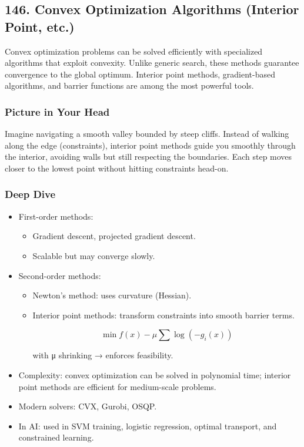 \documentclass[
  letterpaper,
  DIV=11,
  numbers=noendperiod]{scrreprt}
\providecommand{\tightlist}{%
  \setlength{\itemsep}{0pt}\setlength{\parskip}{0pt}}
\begin{document}
\subsection{146. Convex Optimization Algorithms (Interior Point,
etc.)}\label{convex-optimization-algorithms-interior-point-etc.}

Convex optimization problems can be solved efficiently with specialized
algorithms that exploit convexity. Unlike generic search, these methods
guarantee convergence to the global optimum. Interior point methods,
gradient-based algorithms, and barrier functions are among the most
powerful tools.

\subsubsection{Picture in Your Head}\label{picture-in-your-head-145}

Imagine navigating a smooth valley bounded by steep cliffs. Instead of
walking along the edge (constraints), interior point methods guide you
smoothly through the interior, avoiding walls but still respecting the
boundaries. Each step moves closer to the lowest point without hitting
constraints head-on.

\subsubsection{Deep Dive}\label{deep-dive-145}

\begin{itemize}
\item
  First-order methods:

  \begin{itemize}
  \tightlist
  \item
    Gradient descent, projected gradient descent.
  \item
    Scalable but may converge slowly.
  \end{itemize}
\item
  Second-order methods:

  \begin{itemize}
  \item
    Newton's method: uses curvature (Hessian).
  \item
    Interior point methods: transform constraints into smooth barrier
    terms.

    \[
    \min f(x) - μ \sum \log(-g_i(x))
    \]

    with μ shrinking → enforces feasibility.
  \end{itemize}
\item
  Complexity: convex optimization can be solved in polynomial time;
  interior point methods are efficient for medium-scale problems.
\item
  Modern solvers: CVX, Gurobi, OSQP.
\item
  In AI: used in SVM training, logistic regression, optimal transport,
  and constrained learning.
\end{itemize}
\end{document}
